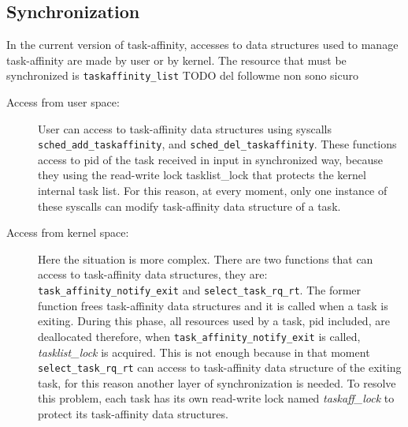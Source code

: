 \subsection{Synchronization}

In the current version of task-affinity, accesses to data structures used to manage task-affinity are made by user or by kernel. The resource that must be
synchronized is \texttt{taskaffinity\_list} TODO del followme non sono sicuro

\begin{description}

\item[Access from user space:] User can access to task-affinity data structures using syscalls \texttt{sched\_add\_taskaffinity}, and 
\texttt{sched\_del\_taskaffinity}. These functions access to pid of the task received in input in synchronized way, because they using the read-write lock
tasklist\_lock that protects the kernel internal task list. For this reason, at every moment, only one instance of these syscalls can modify task-affinity 
data structure of a task.

\item[Access from kernel space:] Here the situation is more complex. There are two functions that can access to task-affinity data structures, they are:
\texttt{task\_affinity\_notify\_exit} and \texttt{select\_task\_rq\_rt}. The former function frees task-affinity data structures and it is called when a 
task is exiting. During this phase, all resources used by a task, pid included, are deallocated therefore, when \texttt{task\_affinity\_notify\_exit} is 
called, \textit{tasklist\_lock} is acquired. This is not enough because in that moment \texttt{select\_task\_rq\_rt} can access to task-affinity data 
structure of the exiting task, for this reason another layer of synchronization is needed. To resolve this problem, each task has its own read-write lock 
named \textit{taskaff\_lock} to protect its task-affinity data structures. 

\end{description}


